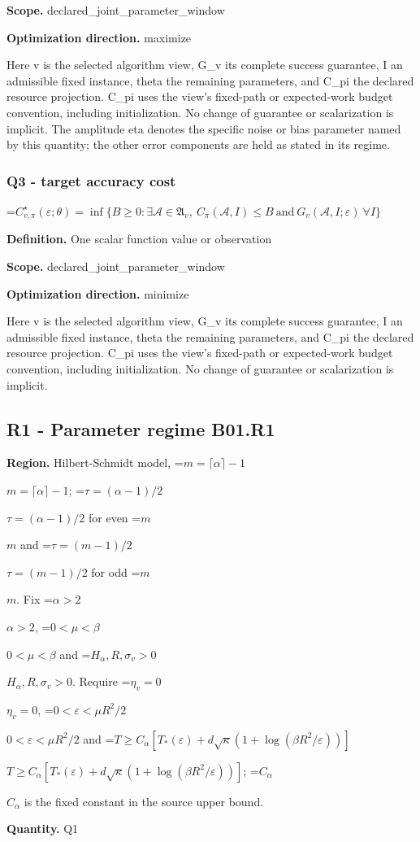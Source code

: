 \documentclass[10pt,a4paper]{article}
\newcommand{\AtlasMath}[1]{\par\begingroup\centering\setbox0=\hbox{$\displaystyle #1$}\ifdim\wd0>1.4\linewidth\typeout{ATLAS WIDE FORMULA: \the\wd0}\fi\ifdim\wd0>\linewidth\resizebox{\linewidth}{!}{\box0}\else\box0\fi\par\endgroup}
\newcommand{\AtlasInlineMath}[1]{\begingroup\setbox0=\hbox{$#1$}\ifdim\wd0>.4\linewidth\endgroup\AtlasMath{#1}\else\endgroup$#1$\fi}
\begin{document}
\textbf{Scope.} declared\_joint\_parameter\_window

\textbf{Optimization direction.} maximize

Here v is the selected algorithm view, G\_v its complete success guarantee, I an admissible fixed instance, theta the remaining parameters, and C\_pi the declared resource projection. C\_pi uses the view's fixed-path or expected-work budget convention, including initialization. No change of guarantee or scalarization is implicit. The amplitude eta denotes the specific noise or bias parameter named by this quantity; the other error components are held as stated in its regime.

\subsubsection{Q3 - target accuracy cost}
\AtlasMath{C^\star_{v,\pi}(\varepsilon;\theta)=\inf\{B\ge0:\exists\mathcal A\in\mathfrak A_v,\ C_\pi(\mathcal A,I)\le B\ \text{and}\ G_v(\mathcal A,I;\varepsilon)\ \forall I\}}
\textbf{Definition.} One scalar function value or observation

\textbf{Scope.} declared\_joint\_parameter\_window

\textbf{Optimization direction.} minimize

Here v is the selected algorithm view, G\_v its complete success guarantee, I an admissible fixed instance, theta the remaining parameters, and C\_pi the declared resource projection. C\_pi uses the view's fixed-path or expected-work budget convention, including initialization. No change of guarantee or scalarization is implicit.

\subsection{R1 - Parameter regime B01.R1}
\textbf{Region.} Hilbert-Schmidt model, \AtlasInlineMath{m=\lceil\alpha\rceil-1}; \AtlasInlineMath{\tau=(\alpha-1)/2} for even \AtlasInlineMath{m} and \AtlasInlineMath{\tau=(m-1)/2} for odd \AtlasInlineMath{m}. Fix \AtlasInlineMath{\alpha>2}, \AtlasInlineMath{0<\mu<\beta} and \AtlasInlineMath{H_\alpha,R,\sigma_v>0}. Require \AtlasInlineMath{\eta_v=0}, \AtlasInlineMath{0<\varepsilon<\mu R^2/2} and \AtlasInlineMath{T\ge C_\alpha[T_*(\varepsilon)+d\sqrt\kappa(1+\log(\beta R^2/\varepsilon))]}; \AtlasInlineMath{C_\alpha} is the fixed constant in the source upper bound.

\textbf{Quantity.} Q1
\end{document}
